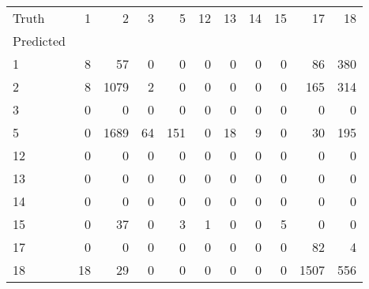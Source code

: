 \begin{tabular}{lrrrrrrrrrr}
\toprule
Truth & 1 & 2 & 3 & 5 & 12 & 13 & 14 & 15 & 17 & 18 \\
Predicted &  &  &  &  &  &  &  &  &  &  \\
\midrule
1 & 8 & 57 & 0 & 0 & 0 & 0 & 0 & 0 & 86 & 380 \\
2 & 8 & 1079 & 2 & 0 & 0 & 0 & 0 & 0 & 165 & 314 \\
3 & 0 & 0 & 0 & 0 & 0 & 0 & 0 & 0 & 0 & 0 \\
5 & 0 & 1689 & 64 & 151 & 0 & 18 & 9 & 0 & 30 & 195 \\
12 & 0 & 0 & 0 & 0 & 0 & 0 & 0 & 0 & 0 & 0 \\
13 & 0 & 0 & 0 & 0 & 0 & 0 & 0 & 0 & 0 & 0 \\
14 & 0 & 0 & 0 & 0 & 0 & 0 & 0 & 0 & 0 & 0 \\
15 & 0 & 37 & 0 & 3 & 1 & 0 & 0 & 5 & 0 & 0 \\
17 & 0 & 0 & 0 & 0 & 0 & 0 & 0 & 0 & 82 & 4 \\
18 & 18 & 29 & 0 & 0 & 0 & 0 & 0 & 0 & 1507 & 556 \\
\bottomrule
\end{tabular}
